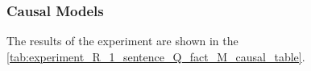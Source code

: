 \documentclass{wseas}
\begin{document}
\subsubsection{Causal Models}

The results of the experiment are shown in the \autoref{tab:experiment_R_1_sentence_Q_fact_M_causal_table}.
\end{document}
